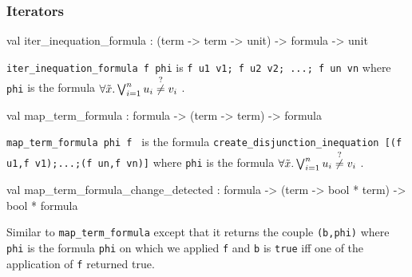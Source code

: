 \subsubsection{Iterators}




\label{val:Term.iter-underscoreinequation-underscoreformula}\begin{ocamldoccode}
val iter_inequation_formula : (term -> term -> unit) -> formula -> unit
\end{ocamldoccode}
\begin{ocamldocdescription}
{\tt{iter\_inequation\_formula f phi}} is {\tt{f u1 v1; f u2 v2; ...; f un vn}} where {\tt{phi}} is the formula
    $\forall \tilde{x}. \bigvee_{i = 1}^n  u_i \stackrel{?}{\neq} v_i$ .


\end{ocamldocdescription}




\label{val:Term.map-underscoreterm-underscoreformula}\begin{ocamldoccode}
val map_term_formula : formula -> (term -> term) -> formula
\end{ocamldoccode}
\begin{ocamldocdescription}
{\tt{map\_term\_formula phi f }} is the formula {\tt{create\_disjunction\_inequation [(f u1,f v1);...;(f un,f vn)]}}
    where {\tt{phi}} is the formula $\forall \tilde{x}. \bigvee_{i = 1}^n  u_i \stackrel{?}{\neq} v_i$ .


\end{ocamldocdescription}




\label{val:Term.map-underscoreterm-underscoreformula-underscorechange-underscoredetected}\begin{ocamldoccode}
val map_term_formula_change_detected :
  formula -> (term -> bool * term) -> bool * formula
\end{ocamldoccode}
\begin{ocamldocdescription}
Similar to {\tt{map\_term\_formula}} except that it returns the couple {\tt{(b,phi{\textquotesingle})}} where {\tt{phi{\textquotesingle}}} is the 
   formula {\tt{phi}} on which we applied {\tt{f}} and {\tt{b}} is {\tt{true}} iff one of the application of {\tt{f}} returned
   true.


\end{ocamldocdescription}




